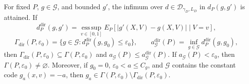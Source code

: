 For fixed \(P\), \(g\in\mathcal G\), and bounded \(g'\), the infimum over \(d\in\mathcal D_{\gamma_D,L_D}\) in \(d_P(g,g')\) is attained. If
\[
 d_P^{\mathrm{dir}}(g,g')=\operatorname*{ess\,sup}_{v\in[0,1]}
 E_P[|g'(X,V)-g(X,V)|\mid V=v],
\]
\[
 \Gamma_{\mathrm{dir}}(P,\varepsilon_0)
 =\{g\in\mathcal G:d_P^{\mathrm{dir}}(g,g_0)\le\varepsilon_0\},
 \qquad
 a_{\mathcal G}^{\mathrm{dir}}(P)=\inf_{g\in\mathcal G}d_P^{\mathrm{dir}}(g,g_0),
\]
then \(\Gamma_{\mathrm{dir}}(P,\varepsilon_0)\subseteq\Gamma(P,\varepsilon_0)\) and \(a_{\mathcal G}(P)\le a_{\mathcal G}^{\mathrm{dir}}(P)\). If \(a_{\mathcal G}(P)<\varepsilon_0\), then \(\Gamma(P,\varepsilon_0)\ne\varnothing\). Moreover, if \(g_0=0\), \(\varepsilon_0<a\le C_g\), and \(\mathcal G\) contains the constant code \(g_a(x,v)=-a\), then \(g_a\in\Gamma(P,\varepsilon_0)\setminus\Gamma_{\mathrm{dir}}(P,\varepsilon_0)\).